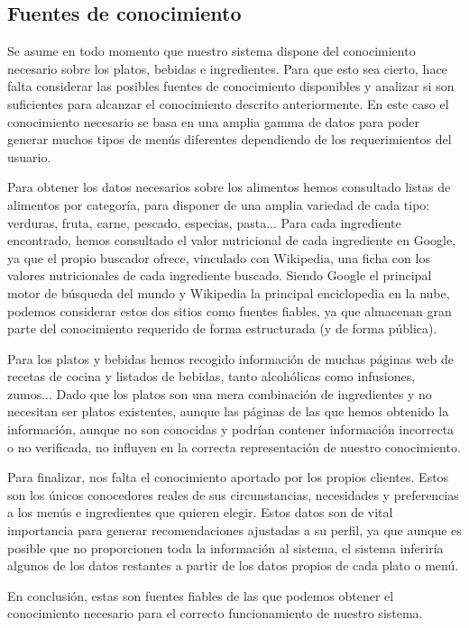 \documentclass{article}
\begin{document}
\subsection{Fuentes de conocimiento}
Se asume en todo momento que nuestro sistema dispone del conocimiento necesario sobre los platos, bebidas e ingredientes. Para que esto sea cierto, hace falta considerar las posibles fuentes de conocimiento disponibles y analizar si son suficientes para alcanzar el conocimiento descrito anteriormente. En este caso el conocimiento necesario se basa en una amplia gamma de datos para poder generar muchos tipos de menús diferentes dependiendo de los requerimientos del usuario.
\par
Para obtener los datos necesarios sobre los alimentos hemos consultado listas de alimentos por categoría, para disponer de una amplia variedad de cada tipo: verduras, fruta, carne, pescado, especias, pasta... Para cada ingrediente encontrado, hemos consultado el valor nutricional de cada ingrediente en Google, ya que el propio buscador ofrece, vinculado con Wikipedia, una ficha con los valores nutricionales de cada ingrediente buscado. Siendo Google el principal motor de búsqueda del mundo y Wikipedia la principal enciclopedia en la nube, podemos considerar estos dos sitios como fuentes fiables, ya que almacenan gran parte del conocimiento requerido de forma estructurada (y de forma pública).
\par
Para los platos y bebidas hemos recogido información de muchas páginas web de recetas de cocina y listados de bebidas, tanto alcohólicas como infusiones, zumos...
Dado que los platos son una mera combinación de ingredientes y no necesitan ser platos existentes, aunque las páginas de las que hemos obtenido la información, aunque no son conocidas y podrían contener información incorrecta o no verificada, no influyen en la correcta representación de nuestro conocimiento.
\par
Para finalizar, nos falta el conocimiento aportado por los propios clientes. Estos son los únicos conocedores reales de sus circunstancias, necesidades y preferencias a los menús e ingredientes que quieren elegir. Estos datos son de vital importancia para generar recomendaciones ajustadas a su perfil, ya que aunque es posible que no proporcionen toda la información al sistema, el sistema inferiría algunos de los datos restantes a partir de los datos propios de cada plato o menú.
\par
En conclusión, estas son fuentes fiables de las que podemos obtener el conocimiento necesario para el correcto funcionamiento de nuestro sistema.
\end{document}
